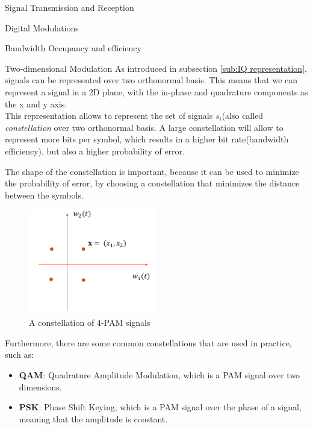 \begin{section}{Signal Transmission and Reception}
\begin{subsection}{Digital Modulations}
\begin{subsubsection}{Bandwidth Occupancy and efficiency}
    \end{subsubsection}
    \begin{subsubsection}{Two-dimensional Modulation}
      As introduced in subsection \ref{sub:IQ representation}, signals can be represented over two 
      orthonormal basis. This means that we can represent a signal in a 2D plane, with the
      in-phase and quadrature components as the x and y axis.\\
      This representation allows to represent the set of signals $s_i$(also called \textit{constellation}
      over two orthonormal basis. A large constellation will allow to represent more bits per symbol,
      which results in a higher bit rate(bandwidth efficiency), but also a higher probability of 
      error.\\

      \begin{boxH}
        The shape of the constellation is important, because it can be used to minimize the probability
        of error, by choosing a constellation that minimizes the distance between the symbols.
      \end{boxH}
      \begin{figure}[h]
        \centering
        \includegraphics[width=0.5\textwidth]{img/wireless/iq representation.png}
        \caption{A constellation of 4-PAM signals}
      \end{figure}
      Furthermore, there are some common constellations that are used in practice, such as:
      \begin{itemize}
        \item \textbf{QAM}: Quadrature Amplitude Modulation, which is a PAM signal over two
          dimensions.
        \item \textbf{PSK}: Phase Shift Keying, which is a PAM signal over the phase of a signal, 
          meaning that the amplitude is constant.
      \end{itemize}
    \end{subsubsection}


\end{subsection}
\end{section}
